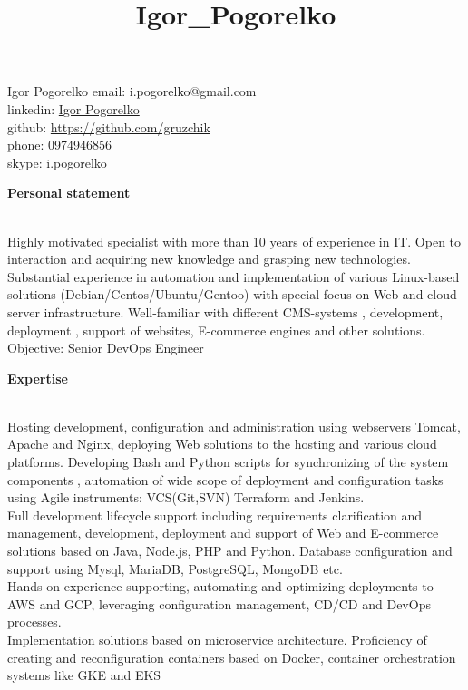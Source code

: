 \documentclass[letterpaper]{article}
\date{}
\title{Igor\_Pogorelko}
\makeatletter
\newcommand{\resheader}[6]{
    \begin{tabular*}{\textwidth}{l@{\extracolsep{\fill}}cr}
    #3 & \textbf{\LARGE #1} & #5\\
    #4 & \url{#2}           & #6\\
    \end{tabular*}
    \\
    \vspace{0.1in}
}
\renewcommand{\section}[1]{
  {
    \large \colorbox{my-gray}{
      \begin{minipage}
        {\textwidth-0.175in}
        {\textbf{#1 \vphantom{p\^{E}}}}
      \end{minipage}
    }
  }
}
\renewcommand\maketitle{}
\makeatother
\begin{document}
\maketitle
{\LARGE Igor Pogorelko} \hfill {email: i.pogorelko@gmail.com}\\
\hfill {linkedin: \href{https://www.linkedin.com/in/igor-pogorelko-a2b16941}{Igor Pogorelko}}\\
\hfill {github: \href{https://github.com/gruzchik}{https://github.com/gruzchik}}\\
\hfill {phone: 0974946856}\\
\hfill {skype: i.pogorelko}\\
\vspace*{1em plus .6em minus .5em}
\section{Personal statement}
\label{sec-1-1}
\\
Highly motivated specialist with more than 10 years of experience in IT. Open to interaction and acquiring new knowledge and grasping new technologies.\\
Substantial experience in automation and implementation of various  Linux-based solutions (Debian/Centos/Ubuntu/Gentoo) with special focus on Web and cloud server infrastructure. Well-familiar with different CMS-systems , development, deployment , support  of websites, E-commerce engines and other solutions.\\
\vspace*{1em plus .6em minus .5em}
Objective: Senior DevOps Engineer\\
\section{Expertise}
\label{sec-1-1}
\\
Hosting development, configuration and administration using webservers Tomcat, Apache and Nginx, deploying Web solutions to the hosting and various cloud platforms. Developing Bash and Python scripts for synchronizing of the system components , automation of wide scope of deployment and configuration tasks using Agile instruments: VCS(Git,SVN) Terraform and Jenkins.\\
Full development lifecycle support including requirements clarification and management, development, deployment and support of Web and E-commerce solutions based on Java, Node.js, PHP and Python. Database configuration and support using Mysql, MariaDB, PostgreSQL, MongoDB etc.\\
Hands-on experience supporting, automating and optimizing deployments to AWS and GCP, leveraging configuration management, CD/CD and DevOps processes.\\
\vspace*{1em plus .6em minus .5em}
Implementation solutions based on microservice architecture. Proficiency of creating and reconfiguration containers based on Docker, container orchestration systems like GKE and EKS
\end{document}
